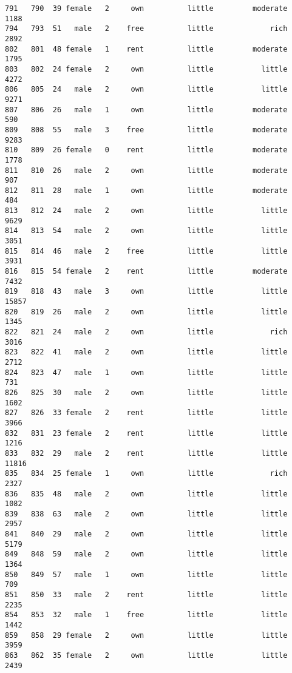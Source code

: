 \documentclass[
]{article}
\begin{document}
\begin{verbatim}
791   790  39 female   2     own          little         moderate          1188
794   793  51   male   2    free          little             rich          2892
802   801  48 female   1    rent          little         moderate          1795
803   802  24 female   2     own          little           little          4272
806   805  24   male   2     own          little           little          9271
807   806  26   male   1     own          little         moderate           590
809   808  55   male   3    free          little         moderate          9283
810   809  26 female   0    rent          little         moderate          1778
811   810  26   male   2     own          little         moderate           907
812   811  28   male   1     own          little         moderate           484
813   812  24   male   2     own          little           little          9629
814   813  54   male   2     own          little           little          3051
815   814  46   male   2    free          little           little          3931
816   815  54 female   2    rent          little         moderate          7432
819   818  43   male   3     own          little           little         15857
820   819  26   male   2     own          little           little          1345
822   821  24   male   2     own          little             rich          3016
823   822  41   male   2     own          little           little          2712
824   823  47   male   1     own          little           little           731
826   825  30   male   2     own          little           little          1602
827   826  33 female   2    rent          little           little          3966
832   831  23 female   2    rent          little           little          1216
833   832  29   male   2    rent          little           little         11816
835   834  25 female   1     own          little             rich          2327
836   835  48   male   2     own          little           little          1082
839   838  63   male   2     own          little           little          2957
841   840  29   male   2     own          little           little          5179
849   848  59   male   2     own          little           little          1364
850   849  57   male   1     own          little           little           709
851   850  33   male   2    rent          little           little          2235
854   853  32   male   1    free          little           little          1442
859   858  29 female   2     own          little           little          3959
863   862  35 female   2     own          little           little          2439

\end{verbatim}
\end{document}
